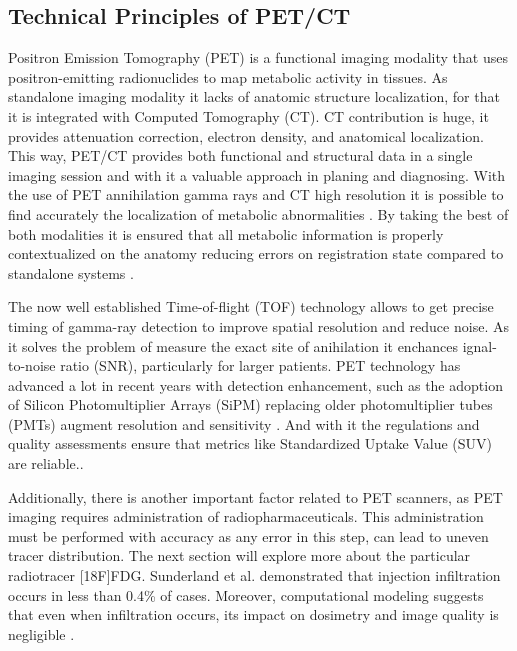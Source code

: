 \subsection{Technical Principles of PET/CT}

Positron Emission Tomography (PET) is a functional imaging modality that uses positron-emitting radionuclides to map metabolic activity in tissues. As standalone imaging modality it lacks of anatomic structure localization, for that it is integrated with Computed Tomography (CT). CT contribution is huge, it provides attenuation correction, electron density, and anatomical localization. This way, PET/CT provides both functional and structural data in a single imaging session and with it a valuable approach in planing and diagnosing. With the use of PET annihilation gamma rays and CT high resolution it is possible to find accurately the localization of metabolic abnormalities \cite{TG174}. By taking the best of both modalities it is ensured that all metabolic information is properly contextualized on the anatomy reducing errors on registration state compared to standalone systems \cite{TG126}.



The now well established Time-of-flight (TOF) technology allows to get precise timing of gamma-ray detection to improve spatial resolution and reduce noise. As it solves the problem of measure the exact site of anihilation it enchances ignal-to-noise ratio (SNR), particularly for larger patients. \cite{Seifert2022} PET technology has advanced a lot in recent years with detection enhancement, such as the adoption of Silicon Photomultiplier Arrays (SiPM) replacing older photomultiplier tubes (PMTs) augment resolution and sensitivity \cite{SunderlandSeminar}. And with it the regulations and quality assessments ensure that metrics like Standardized Uptake Value (SUV) are reliable.\cite{TG174}.

Additionally, there is another important factor related to PET scanners, as PET imaging requires administration of radiopharmaceuticals. This administration must be performed with accuracy as any error in this step, can lead to uneven tracer distribution. The next section will explore more about the particular radiotracer [18F]FDG. Sunderland et al. demonstrated that injection infiltration occurs in less than 0.4\% of cases. Moreover, computational modeling suggests that even when infiltration occurs, its impact on dosimetry and image quality is negligible  \cite{Sunderland2023}. 


